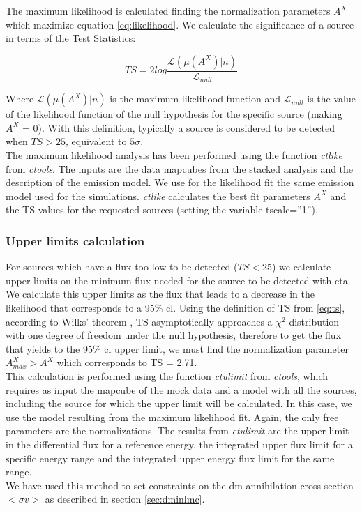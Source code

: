 \documentclass[main.tex]{subfiles}
\begin{document}
    The maximum likelihood is calculated finding the normalization parameters $A^{X}$ which maximize equation \ref{eq:likelihood}.
    We calculate the significance of a source in terms of the Test Statistics:

    \begin{equation}
      TS = 2log \frac{\mathcal{L}(\mu(A^{X})|n)}{\mathcal{L}_{null}}
      \label{eq:ts}
    \end{equation}

    Where $\mathcal{L}(\mu(A^{X})|n)$ is the maximum likelihood function and $\mathcal{L}_{null}$ is the value of the likelihood function of the null hypothesis for the specific source (making $A^X$ = 0). With this definition, typically a source is considered to be detected when $TS>25$, equivalent to $5\sigma$.\\
    The maximum likelihood analysis has been performed using the function \textit{ctlike} from \textit{ctools}. The inputs are the data mapcubes from the stacked analysis and the description of the emission model. We use for the likelihood fit the same emission model used for the simulations. \textit{ctlike} calculates the best fit parameters $A^X$ and the TS values for the requested sources (setting the variable tscalc=''1'').

    \subsubsection{Upper limits calculation}

    For sources which have a flux too low to be detected ($TS < 25$) we calculate upper limits on the minimum flux needed for the source to be detected with \gls{cta}. We calculate this upper limits as the flux that leads to a decrease in the likelihood that corresponds to a 95\% \gls{cl}. Using the definition of TS from \ref{eq:ts}, according to Wilks' theorem \cite{wilks1938}, TS asymptotically approaches a $\chi^2$-distribution with one degree of freedom under the null hypothesis, therefore to get the flux that yields to the 95\% \gls{cl} upper limit, we must find the normalization parameter $A^X_{max} > A^{X}$ which corresponds to TS = 2.71.\\
    This calculation is performed using the function \textit{ctulimit} from \textit{ctools}, which requires as input the mapcube of the mock data and a model with all the sources, including the source for which the upper limit will be calculated. In this case, we use the model resulting from the maximum likelihood fit. Again, the only free parameters are the normalizations. The results from \textit{ctulimit} are the upper limit in the differential flux for a reference energy, the integrated upper flux limit for a specific energy range and the integrated upper energy flux limit for the same range.\\
        We have used this method to set constraints on the \gls{dm} annihilation cross section $<\sigma v>$ as described in section \ref{sec:dminlmc}.
    
\end{document}
